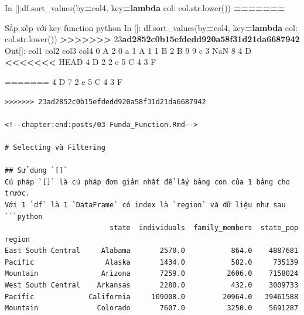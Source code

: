 \documentclass[
]{book}
\newenvironment{Shaded}{\begin{snugshade}}{\end{snugshade}}
\newcommand{\BuiltInTok}[1]{#1}
\newcommand{\DecValTok}[1]{\textcolor[rgb]{0.00,0.00,0.81}{#1}}
\newcommand{\ErrorTok}[1]{\textcolor[rgb]{0.64,0.00,0.00}{\textbf{#1}}}
\newcommand{\KeywordTok}[1]{\textcolor[rgb]{0.13,0.29,0.53}{\textbf{#1}}}
\newcommand{\NormalTok}[1]{#1}
\newcommand{\OperatorTok}[1]{\textcolor[rgb]{0.81,0.36,0.00}{\textbf{#1}}}
\newcommand{\StringTok}[1]{\textcolor[rgb]{0.31,0.60,0.02}{#1}}
\begin{document}
\begin{Shaded}
\begin{Highlighting}[]
\NormalTok{In []:df.sort\_values(by}\OperatorTok{=}\StringTok{\textquotesingle{}col4\textquotesingle{}}\NormalTok{, key}\OperatorTok{=}\KeywordTok{lambda}\NormalTok{ col: col.}\BuiltInTok{str}\NormalTok{.lower())}
\OperatorTok{=======}

\NormalTok{Sắp xếp với key function}
\NormalTok{\textasciigrave{}\textasciigrave{}\textasciigrave{}python}
\NormalTok{In []: df.sort\_values(by}\OperatorTok{=}\StringTok{\textquotesingle{}col4\textquotesingle{}}\NormalTok{, key}\OperatorTok{=}\KeywordTok{lambda}\NormalTok{ col: col.}\BuiltInTok{str}\NormalTok{.lower())}
\OperatorTok{\textgreater{}\textgreater{}\textgreater{}\textgreater{}\textgreater{}\textgreater{}\textgreater{}} \DecValTok{23}\ErrorTok{ad2852c0b15efdedd920a58f31d21da6687942}
\NormalTok{Out[]:}
\NormalTok{  col1  col2  col3 col4}
\DecValTok{0}\NormalTok{    A     }\DecValTok{2}     \DecValTok{0}\NormalTok{    a}
\DecValTok{1}\NormalTok{    A     }\DecValTok{1}     \DecValTok{1}\NormalTok{    B}
\DecValTok{2}\NormalTok{    B     }\DecValTok{9}     \DecValTok{9}\NormalTok{    c}
\DecValTok{3}\NormalTok{  NaN     }\DecValTok{8}     \DecValTok{4}\NormalTok{    D}
\OperatorTok{\textless{}\textless{}\textless{}\textless{}\textless{}\textless{}\textless{}}\NormalTok{ HEAD}
\DecValTok{4}\NormalTok{    D     }\DecValTok{2}     \DecValTok{2}\NormalTok{    e}
\DecValTok{5}\NormalTok{    C     }\DecValTok{4}     \DecValTok{3}\NormalTok{    F}
\end{Highlighting}
\end{Shaded}

=======
4 D 7 2 e
5 C 4 3 F

\begin{verbatim}
>>>>>>> 23ad2852c0b15efdedd920a58f31d21da6687942

<!--chapter:end:posts/03-Funda_Function.Rmd-->

# Selecting và Filtering

## Sử dụng `[]`
Cú pháp `[]` là cú pháp đơn giản nhất để lấy bảng con của 1 bảng cho trước.
Với 1 `df` là 1 `DataFrame` có index là `region` và dữ liệu như sau
```python
                         state  individuals  family_members  state_pop
region                                                                
East South Central     Alabama       2570.0           864.0    4887681
Pacific                 Alaska       1434.0           582.0     735139
Mountain               Arizona       7259.0          2606.0    7158024
West South Central    Arkansas       2280.0           432.0    3009733
Pacific             California     109008.0         20964.0   39461588
Mountain              Colorado       7607.0          3250.0    5691287
\end{verbatim}
\end{document}
